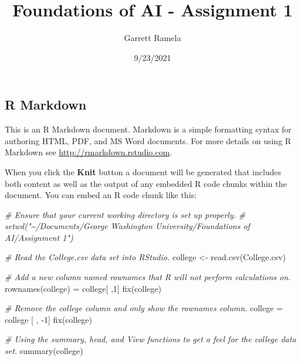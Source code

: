 \documentclass[
]{article}
\title{Foundations of AI - Assignment 1}
\author{Garrett Ramela}
\date{9/23/2021}
\newenvironment{Shaded}{\begin{snugshade}}{\end{snugshade}}
\newcommand{\CommentTok}[1]{\textcolor[rgb]{0.56,0.35,0.01}{\textit{#1}}}
\newcommand{\DecValTok}[1]{\textcolor[rgb]{0.00,0.00,0.81}{#1}}
\newcommand{\FunctionTok}[1]{\textcolor[rgb]{0.00,0.00,0.00}{#1}}
\newcommand{\NormalTok}[1]{#1}
\newcommand{\OtherTok}[1]{\textcolor[rgb]{0.56,0.35,0.01}{#1}}
\newcommand{\SpecialCharTok}[1]{\textcolor[rgb]{0.00,0.00,0.00}{#1}}
\newcommand{\StringTok}[1]{\textcolor[rgb]{0.31,0.60,0.02}{#1}}
\begin{document}
\maketitle

\hypertarget{r-markdown}{%
\subsection{R Markdown}\label{r-markdown}}

This is an R Markdown document. Markdown is a simple formatting syntax
for authoring HTML, PDF, and MS Word documents. For more details on
using R Markdown see \url{http://rmarkdown.rstudio.com}.

When you click the \textbf{Knit} button a document will be generated
that includes both content as well as the output of any embedded R code
chunks within the document. You can embed an R code chunk like this:

\begin{Shaded}
\begin{Highlighting}[]
\CommentTok{\# Ensure that your current working directory is set up properly.}
\CommentTok{\# setwd("\textasciitilde{}/Documents/George Washington University/Foundations of AI/Assignment 1")}

\CommentTok{\# Read the College.csv data set into RStudio.}
\NormalTok{college }\OtherTok{\textless{}{-}} \FunctionTok{read.csv}\NormalTok{(}\StringTok{\textquotesingle{}College.csv\textquotesingle{}}\NormalTok{) }

\CommentTok{\# Add a new column named rownames that R will not perform calculations on.}
\FunctionTok{rownames}\NormalTok{(college) }\OtherTok{=}\NormalTok{ college[ ,}\DecValTok{1}\NormalTok{]}
\FunctionTok{fix}\NormalTok{(college)}

\CommentTok{\# Remove the college column and only show the rownames column.}
\NormalTok{college }\OtherTok{=}\NormalTok{ college [ , }\SpecialCharTok{{-}}\DecValTok{1}\NormalTok{]}
\FunctionTok{fix}\NormalTok{(college)}

\CommentTok{\# Using the summary, head, and View functions to get a feel for the college data set.}
\FunctionTok{summary}\NormalTok{(college)}
\end{Highlighting}
\end{Shaded}
\end{document}
